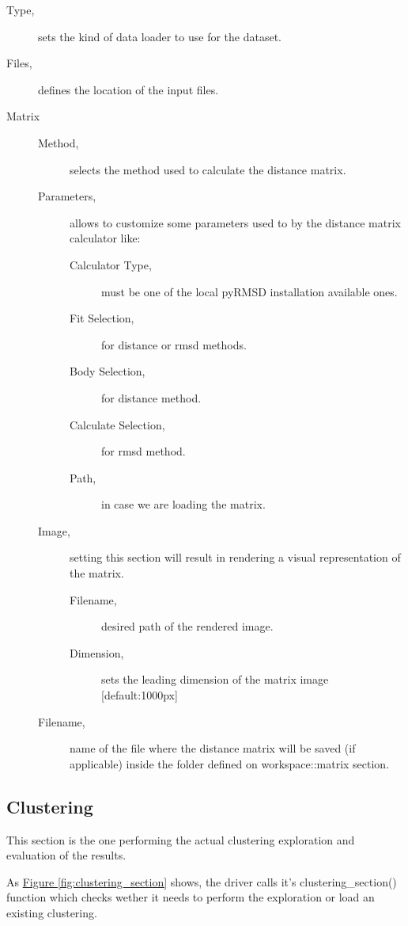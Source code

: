 \begin{description}
\item [Type, ] sets the kind of data loader to use for the dataset.
\item [Files,] defines the location of the input files.
\item [Matrix] \hfil
\begin{description}
\item [Method,] selects the method used to calculate the distance matrix.
\item [Parameters,] allows to customize some parameters used to by the distance matrix calculator like:
\begin{description}
\item [Calculator Type,] must be one of the local pyRMSD installation available ones.
\item [Fit Selection,] for distance or rmsd methods.
\item [Body Selection,] for distance method.
\item [Calculate Selection,] for rmsd method.
\item [Path,] in case we are loading the matrix.
\end{description}
\item [Image,] setting this section will result in rendering a visual representation of the matrix.
\begin{description}
\item [Filename,] desired path of the rendered image.
\item [Dimension,] sets the leading dimension of the matrix image [default:1000px]
\end{description}
\item [Filename,] name of the file where the distance matrix will be saved (if applicable) inside the folder defined on workspace::matrix section. 
\end{description}
\end{description}


\subsection{Clustering}

This section is the one performing the actual clustering exploration and evaluation of the results. 

As \hyperref[fig:clustering_section]{Figure \ref{fig:clustering_section}} shows, the driver calls it's clustering\_section() function which checks wether it needs to perform the exploration or load an existing clustering. 

